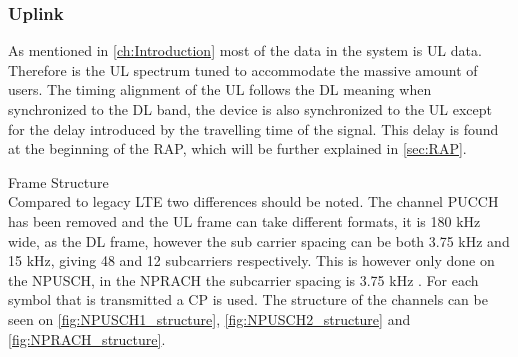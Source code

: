\subsubsection{Uplink}
As mentioned in \autoref{ch:Introduction} most of the data in the system is \gls{UL} data. Therefore is the \gls{UL} spectrum tuned to accommodate the massive amount of users. The timing alignment of the \gls{UL} follows the \gls{DL} meaning when synchronized to the \gls{DL} band, the device is also synchronized to the \gls{UL} except for the delay introduced by the travelling time of the signal. This delay is found at the beginning of the \gls{RAP}, which will be further explained in \autoref{sec:RAP}. 

Frame Structure\\
Compared to legacy \gls{LTE} two differences should be noted. The channel \gls{PUCCH} has been removed and the \gls{UL} frame can take different formats, it is 180 kHz wide, as the \gls{DL} frame, however the sub carrier spacing can be both 3.75 kHz and 15 kHz, giving 48 and 12 subcarriers respectively. This is however only done on the \gls{NPUSCH}, in the \gls{NPRACH} the subcarrier spacing is 3.75 kHz \citep{NB-IoT_Book}. For each symbol that is transmitted a \gls{CP} is used. The structure of the channels can be seen on \autoref{fig:NPUSCH1_structure}, \autoref{fig:NPUSCH2_structure} and \autoref{fig:NPRACH_structure}.

